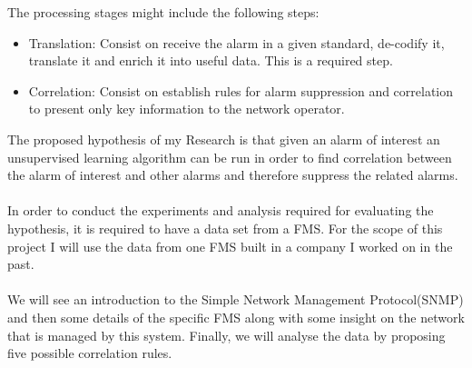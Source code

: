 \documentclass[10pt,a4paper]{report}
\begin{document}
The processing stages might include the following steps:

\begin{itemize}
\item Translation: Consist on receive the alarm in a given standard, de-codify it, translate it and enrich it into useful data. This is a required step.

\item Correlation: Consist on establish rules for alarm suppression and correlation to present only key information to the network operator.
\end{itemize}

The proposed hypothesis of my Research is that given an alarm of interest an unsupervised learning algorithm can be run in order to find correlation between the alarm of interest and other alarms and therefore suppress the related alarms.
\\\\
In order to conduct the experiments and analysis required for evaluating the hypothesis, it is required to have a data set from a FMS. For the scope of this project I will use the data from one FMS built in a company I worked on in the past.
\\\\
We will see an introduction to the Simple Network Management Protocol(SNMP) and then some details of the specific FMS along with some insight on the network that is managed by this system. Finally, we will analyse the data by proposing five possible correlation rules.
\end{document}
